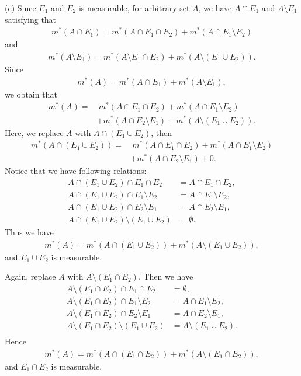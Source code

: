 \documentclass{book}
\begin{document}
(c) Since $E_1$ and $E_2$ is measurable, for arbitrary set $A$, we have $A \cap E_1$ and $A \setminus E_1$ satisfying that
    \begin{align*}
        m^*(A \cap E_1) = m^*(A \cap E_1 \cap E_2) + m^*(A \cap E_1\setminus E_2)
    \end{align*}
and
    \begin{align*}
        m^*(A \setminus E_1) = m^*(A \setminus E_1 \cap E_2) + m^*(A \setminus (E_1 \cup E_2)).
    \end{align*}
Since
    \begin{align*}
        m^*(A) = m^*(A \cap E_1) + m^*(A \setminus E_1),
    \end{align*}
we obtain that
    \begin{align*}
        m^*(A)
        =&~ m^*(A \cap E_1 \cap E_2) + m^*(A \cap E_1 \setminus E_2)\\
         &+ m^*(A \cap E_2 \setminus E_1) + m^*(A \setminus (E_1 \cup E_2)).
    \end{align*}
Here, we replace $A$ with $A \cap (E_1 \cup E_2)$, then
    \begin{align*}
        m^*(A \cap (E_1 \cup E_2))
        =&~ m^*(A \cap E_1 \cap E_2) + m^*(A \cap E_1 \setminus E_2)\\
        &+ m^*(A \cap E_2 \setminus E_1) + 0.
    \end{align*}
Notice that we have following relations:
    \begin{align*}
        A \cap (E_1 \cup E_2) \cap E_1 \cap E_2 &= A \cap E_1 \cap E_2,\\
        A \cap (E_1 \cup E_2) \cap E_1 \setminus E_2 &= A \cap E_1 \setminus E_2,\\
        A \cap (E_1 \cup E_2) \cap E_2 \setminus E_1 &= A \cap E_2 \setminus E_1,\\
        A \cap (E_1 \cup E_2) \setminus (E_1 \cup E_2) &= \emptyset.
    \end{align*}
Thus we have
    \begin{align*}
        m^*(A) = m^*(A \cap (E_1 \cup E_2)) + m^*(A \setminus (E_1 \cup E_2)),
    \end{align*}
and $E_1 \cup E_2$ is measurable.

Again, replace $A$ with $A \setminus (E_1 \cap E_2)$. Then we have
    \begin{align*}
        A \setminus (E_1 \cap E_2) \cap E_1 \cap E_2 &= \emptyset,\\
        A \setminus (E_1 \cap E_2) \cap E_1 \setminus E_2 &= A \cap E_1 \setminus E_2,\\
        A \setminus (E_1 \cap E_2) \cap E_2 \setminus E_1 &= A \cap E_2 \setminus E_1,\\
        A \setminus (E_1 \cap E_2) \setminus (E_1 \cup E_2) &= A \setminus (E_1 \cup E_2).\\
    \end{align*}
Hence
    \begin{align*}
        m^*(A) = m^*(A \cap (E_1 \cap E_2)) + m^*(A \setminus (E_1 \cap E_2)),
    \end{align*}
and $E_1 \cap E_2$ is measurable.
\end{document}
